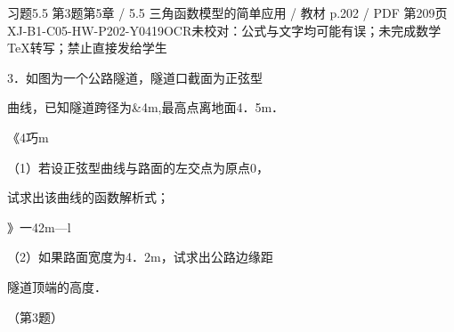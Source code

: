 \begin{bankitem}{习题5.5 第3题}{第5章 / 5.5 三角函数模型的简单应用 / 教材 p.202 / PDF 第209页}{XJ-B1-C05-HW-P202-Y0419}{OCR未校对：公式与文字均可能有误；未完成数学TeX转写；禁止直接发给学生}
\begin{ocrdraft}
\par
3．如图为一个公路隧道，隧道口截面为正弦型
\par
曲线，已知隧道跨径为\&4m,最高点离地面4．5m．
\par
《4巧m
\par
（1）若设正弦型曲线与路面的左交点为原点0，
\par
试求出该曲线的函数解析式；
\par
》一42m—l
\par
（2）如果路面宽度为4．2m，试求出公路边缘距
\par
隧道顶端的高度．
\par
（第3题）
\end{ocrdraft}
\end{bankitem}
